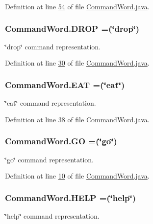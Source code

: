 Definition at line \hyperlink{CommandWord_8java_source_l00054}{54} of file \hyperlink{CommandWord_8java_source}{Command\-Word.\-java}.

\hypertarget{enumCommandWord_a68dbdfb6cdd48bebfc70980afad6d453}{
\subsubsection[{D\-R\-O\-P}]{\setlength{\rightskip}{0pt plus 5cm}Command\-Word.\-D\-R\-O\-P =(\char`\"{}drop\char`\"{})}}\label{enumCommandWord_a68dbdfb6cdd48bebfc70980afad6d453}
\char`\"{}drop\char`\"{} command representation. 

Definition at line \hyperlink{CommandWord_8java_source_l00030}{30} of file \hyperlink{CommandWord_8java_source}{Command\-Word.\-java}.

\hypertarget{enumCommandWord_a8a3ddfcc3d3f62697323325970089d95}{
\subsubsection[{E\-A\-T}]{\setlength{\rightskip}{0pt plus 5cm}Command\-Word.\-E\-A\-T =(\char`\"{}eat\char`\"{})}}\label{enumCommandWord_a8a3ddfcc3d3f62697323325970089d95}
\char`\"{}eat\char`\"{} command representation. 

Definition at line \hyperlink{CommandWord_8java_source_l00038}{38} of file \hyperlink{CommandWord_8java_source}{Command\-Word.\-java}.

\hypertarget{enumCommandWord_ab85d8b5fa5f3890548bff9a1ccfba218}{
\subsubsection[{G\-O}]{\setlength{\rightskip}{0pt plus 5cm}Command\-Word.\-G\-O =(\char`\"{}go\char`\"{})}}\label{enumCommandWord_ab85d8b5fa5f3890548bff9a1ccfba218}
\char`\"{}go\char`\"{} command representation. 

Definition at line \hyperlink{CommandWord_8java_source_l00010}{10} of file \hyperlink{CommandWord_8java_source}{Command\-Word.\-java}.

\hypertarget{enumCommandWord_a8689456b5990b4dfa2c69427a862784d}{
\subsubsection[{H\-E\-L\-P}]{\setlength{\rightskip}{0pt plus 5cm}Command\-Word.\-H\-E\-L\-P =(\char`\"{}help\char`\"{})}}\label{enumCommandWord_a8689456b5990b4dfa2c69427a862784d}
\char`\"{}help\char`\"{} command representation. 


